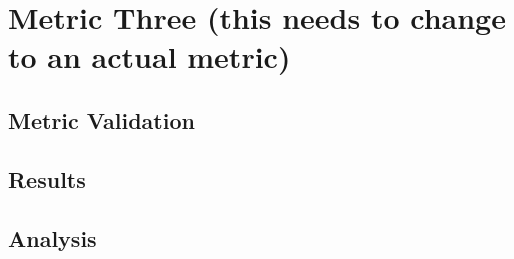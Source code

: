 \section{Metric Three \FIXME(this needs to change to an actual metric)}

\subsection{Metric Validation}

\subsection{Results}

\subsection{Analysis}

